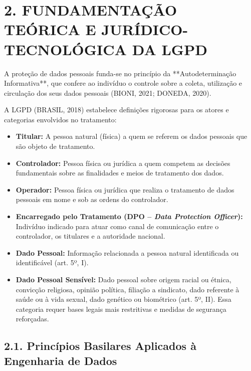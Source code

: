 \newpage

\section*{2. FUNDAMENTAÇÃO TEÓRICA E JURÍDICO-TECNOLÓGICA DA LGPD}

A proteção de dados pessoais funda-se no princípio da **Autodeterminação Informativa**, que confere ao indivíduo o controle sobre a coleta, utilização e circulação dos seus dados pessoais (BIONI, 2021; DONEDA, 2020).

A LGPD (BRASIL, 2018) estabelece definições rigorosas para os atores e categorias envolvidos no tratamento:
\begin{itemize}
    \item \textbf{Titular:} A pessoa natural (física) a quem se referem os dados pessoais que são objeto de tratamento.
    \item \textbf{Controlador:} Pessoa física ou jurídica a quem competem as decisões fundamentais sobre as finalidades e meios de tratamento dos dados.
    \item \textbf{Operador:} Pessoa física ou jurídica que realiza o tratamento de dados pessoais em nome e sob as ordens do controlador.
    \item \textbf{Encarregado pelo Tratamento (DPO -- \textit{Data Protection Officer}):} Indivíduo indicado para atuar como canal de comunicação entre o controlador, os titulares e a autoridade nacional.
    \item \textbf{Dado Pessoal:} Informação relacionada a pessoa natural identificada ou identificável (art. 5º, I).
    \item \textbf{Dado Pessoal Sensível:} Dado pessoal sobre origem racial ou étnica, convicção religiosa, opinião política, filiação a sindicato, dado referente à saúde ou à vida sexual, dado genético ou biométrico (art. 5º, II). Essa categoria requer bases legais mais restritivas e medidas de segurança reforçadas.
\end{itemize}

\subsection*{2.1. Princípios Basilares Aplicados à Engenharia de Dados}

